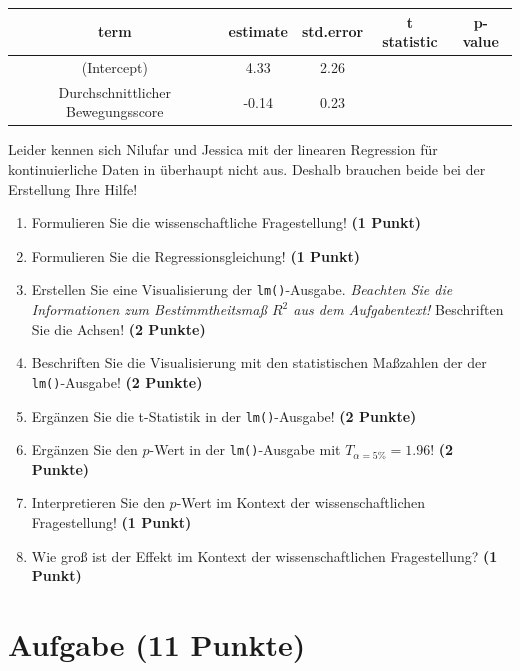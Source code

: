 \documentclass[a4paper, 9pt]{scrartcl}\usepackage[]{graphicx}\usepackage[]{xcolor}
\begin{document}
\begin{table}[!h]
\centering\begingroup\fontsize{11}{13}\selectfont

\begin{tabular}{ccccc}
\toprule
term & estimate & std.error & t statistic & p-value\\
\midrule
(Intercept) & 4.33 & 2.26 &  & \\
Durchschnittlicher Bewegungsscore & -0.14 & 0.23 &  & \\
\bottomrule
\end{tabular}
\endgroup{}
\end{table}



Leider kennen sich Nilufar und Jessica mit der linearen Regression für kontinuierliche Daten in \Rlogo überhaupt nicht aus. Deshalb brauchen beide bei der Erstellung Ihre Hilfe!

\begin{enumerate}
\item Formulieren Sie die wissenschaftliche Fragestellung! \textbf{(1 Punkt)}
\item Formulieren Sie die Regressionsgleichung! \textbf{(1 Punkt)}
\item Erstellen  Sie  eine  Visualisierung  der \texttt{lm()}-Ausgabe. \textit{Beachten Sie die Informationen zum Bestimmtheitsmaß $R^2$ aus dem Aufgabentext!} Beschriften  Sie  die  Achsen! \textbf{(2 Punkte)}
\item Beschriften Sie die Visualisierung mit den statistischen Maßzahlen der der \texttt{lm()}-Ausgabe! \textbf{(2 Punkte)}
\item Ergänzen Sie die t-Statistik in der \texttt{lm()}-Ausgabe! \textbf{(2 Punkte)}
\item Ergänzen Sie den $p$-Wert in der \texttt{lm()}-Ausgabe mit $T_{\alpha = 5\%} = 1.96$!  \textbf{(2 Punkte)}
\item Interpretieren Sie den $p$-Wert im Kontext der wissenschaftlichen Fragestellung! \textbf{(1 Punkt)}  
\item Wie groß ist der Effekt im Kontext der wissenschaftlichen Fragestellung? \textbf{(1 Punkt)}
\end{enumerate} 
\clearpage

\section{Aufgabe \hfill (11 Punkte)}
\end{document}
